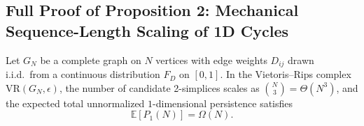 
\subsection{Full Proof of Proposition 2: Mechanical Sequence-Length Scaling of 1D Cycles}
\label{app:prop2_proof}

\begin{proposition}
Let $G_N$ be a complete graph on $N$ vertices with edge weights $D_{ij}$ drawn i.i.d.\ from a
continuous distribution $F_D$ on $[0,1]$.  In the Vietoris--Rips complex $\mathrm{VR}(G_N, \epsilon)$,
the number of candidate 2-simplices scales as $\binom{N}{3} = \Theta(N^3)$, and the expected
total unnormalized $1$-dimensional persistence satisfies
\[
    \mathbb{E}[P_1(N)] = \Omega(N).
\]
\end{proposition}

